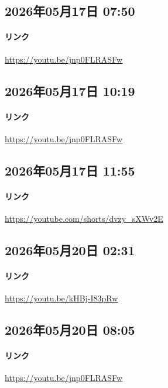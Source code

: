 \subsection*{2026年05月17日 07:50}

\paragraph{リンク}
\url{https://youtu.be/jnp0FLRASFw}

\subsection*{2026年05月17日 10:19}

\paragraph{リンク}
\url{https://youtu.be/jnp0FLRASFw}

\subsection*{2026年05月17日 11:55}

\paragraph{リンク}
\url{https://youtube.com/shorts/dvzy_sXWv2E}

\subsection*{2026年05月20日 02:31}

\paragraph{リンク}
\url{https://youtu.be/kHBj-I83pRw}

\subsection*{2026年05月20日 08:05}

\paragraph{リンク}
\url{https://youtu.be/jnp0FLRASFw}

